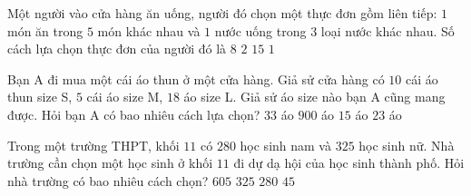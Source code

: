 \begin{ex}%
	Một người vào cửa hàng ăn uống, người đó chọn một thực đơn gồm liên tiếp: $1$ món ăn trong $5$ món  khác nhau và $1$ nước uống trong $3$ loại nước khác nhau. Số cách lựa chọn thực đơn của người đó là
	\choice 
		{$8$} 
		 {$2$}
		{\True  $15$}
		 {$1$}
\end{ex}

\begin{ex}%
	Bạn A  đi mua một cái áo thun ở một cửa hàng. Giả sử cửa hàng có $10$ cái áo thun size S, $5$ cái áo size M, $18$ áo size L. Giả sử áo size nào bạn A cũng mang được. Hỏi bạn A có bao nhiêu cách lựa chọn?
	\choice 
		{\True $33$  áo}
		{$900$ áo} 
		 {$15$ áo}
		{$23$ áo} 
\end{ex}

\begin{ex}%
	Trong một trường THPT, khối $11$ có $280$ học sinh nam và $325$ học sinh nữ. Nhà trường cần chọn một học sinh ở khối $11$  đi dự dạ hội của học sinh thành phố. Hỏi nhà trường có bao nhiêu cách chọn?
	\choice 
		{\True $605$} 
		 {$325$}
		{$280$} 
		 {$45$}
\end{ex}

